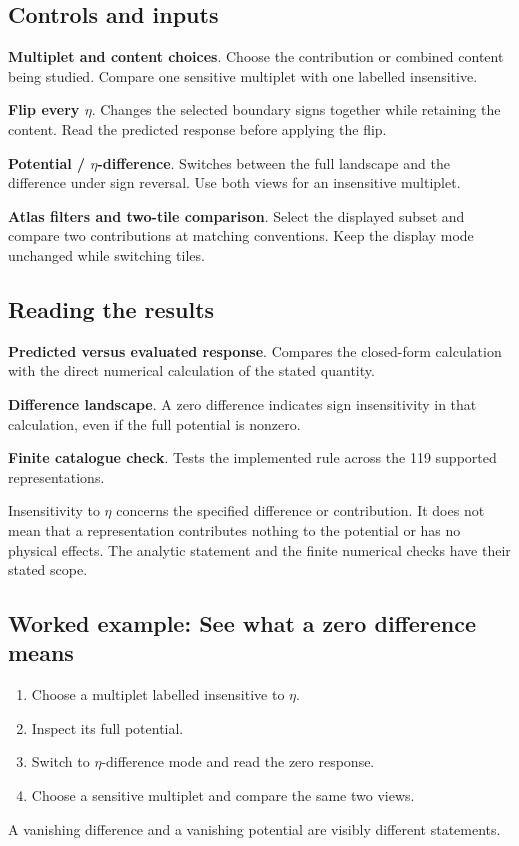 \documentclass[11pt,a4paper]{article}
\begin{document}
\subsection*{Controls and inputs}
\textbf{Multiplet and content choices}. Choose the contribution or combined content being studied. Compare one sensitive multiplet with one labelled insensitive.

\textbf{Flip every \ensuremath{\eta}}. Changes the selected boundary signs together while retaining the content. Read the predicted response before applying the flip.

\textbf{Potential / \ensuremath{\eta}-difference}. Switches between the full landscape and the difference under sign reversal. Use both views for an insensitive multiplet.

\textbf{Atlas filters and two-tile comparison}. Select the displayed subset and compare two contributions at matching conventions. Keep the display mode unchanged while switching tiles.

\subsection*{Reading the results}
\textbf{Predicted versus evaluated response}. Compares the closed-form calculation with the direct numerical calculation of the stated quantity.

\textbf{Difference landscape}. A zero difference indicates sign insensitivity in that calculation, even if the full potential is nonzero.

\textbf{Finite catalogue check}. Tests the implemented rule across the 119 supported representations.

Insensitivity to \ensuremath{\eta} concerns the specified difference or contribution. It does not mean that a representation contributes nothing to the potential or has no physical effects. The analytic statement and the finite numerical checks have their stated scope.
\subsection*{Worked example: See what a zero difference means}
\begin{enumerate}
\item Choose a multiplet labelled insensitive to \ensuremath{\eta}.
\item Inspect its full potential.
\item Switch to \ensuremath{\eta}-difference mode and read the zero response.
\item Choose a sensitive multiplet and compare the same two views.
\end{enumerate}
A vanishing difference and a vanishing potential are visibly different statements.
\end{document}
